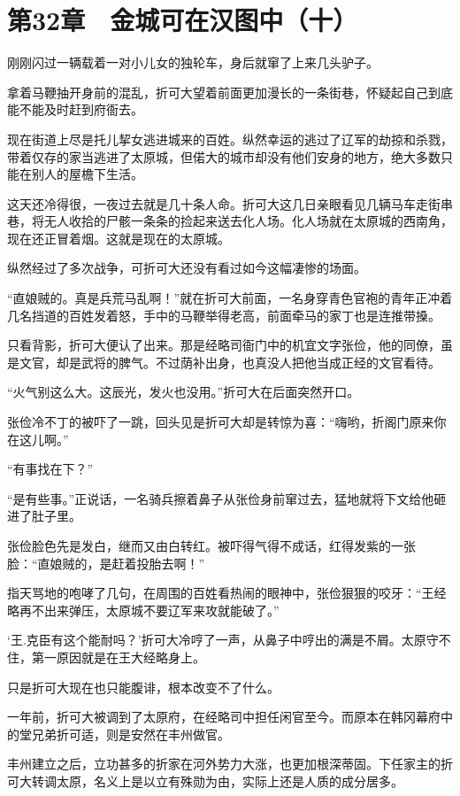 \section{第32章　金城可在汉图中（十）}

刚刚闪过一辆载着一对小儿女的独轮车，身后就窜了上来几头驴子。

拿着马鞭抽开身前的混乱，折可大望着前面更加漫长的一条街巷，怀疑起自己到底能不能及时赶到府衙去。

现在街道上尽是托儿挈女逃进城来的百姓。纵然幸运的逃过了辽军的劫掠和杀戮，带着仅存的家当逃进了太原城，但偌大的城市却没有他们安身的地方，绝大多数只能在别人的屋檐下生活。

这天还冷得很，一夜过去就是几十条人命。折可大这几日亲眼看见几辆马车走街串巷，将无人收拾的尸骸一条条的捡起来送去化人场。化人场就在太原城的西南角，现在还正冒着烟。这就是现在的太原城。

纵然经过了多次战争，可折可大还没有看过如今这幅凄惨的场面。

“直娘贼的。真是兵荒马乱啊！”就在折可大前面，一名身穿青色官袍的青年正冲着几名挡道的百姓发着怒，手中的马鞭举得老高，前面牵马的家丁也是连推带搡。

只看背影，折可大便认了出来。那是经略司衙门中的机宜文字张俭，他的同僚，虽是文官，却是武将的脾气。不过荫补出身，也真没人把他当成正经的文官看待。

“火气别这么大。这辰光，发火也没用。”折可大在后面突然开口。

张俭冷不丁的被吓了一跳，回头见是折可大却是转惊为喜：“嗨哟，折阁门原来你在这儿啊。”

“有事找在下？”

“是有些事。”正说话，一名骑兵擦着鼻子从张俭身前窜过去，猛地就将下文给他砸进了肚子里。

张俭脸色先是发白，继而又由白转红。被吓得气得不成话，红得发紫的一张脸：“直娘贼的，是赶着投胎去啊！”

指天骂地的咆哮了几句，在周围的百姓看热闹的眼神中，张俭狠狠的咬牙：“王经略再不出来弹压，太原城不要辽军来攻就能破了。”

‘王.克臣有这个能耐吗？’折可大冷哼了一声，从鼻子中哼出的满是不屑。太原守不住，第一原因就是在王大经略身上。

只是折可大现在也只能腹诽，根本改变不了什么。

一年前，折可大被调到了太原府，在经略司中担任闲官至今。而原本在韩冈幕府中的堂兄弟折可适，则是安然在丰州做官。

丰州建立之后，立功甚多的折家在河外势力大涨，也更加根深蒂固。下任家主的折可大转调太原，名义上是以立有殊勋为由，实际上还是人质的成分居多。

